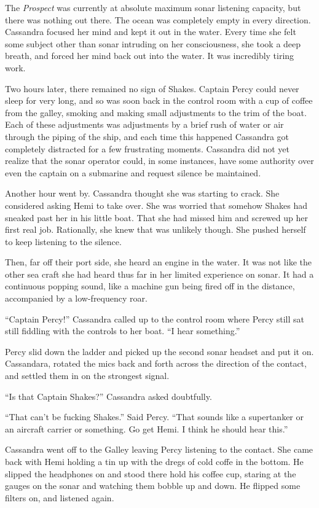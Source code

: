 \documentclass[]{scrbook}
\begin{document}
The \emph{Prospect} was currently at absolute maximum sonar listening
capacity, but there was nothing out there. The ocean was completely
empty in every direction. Cassandra focused her mind and kept it out in
the water. Every time she felt some subject other than sonar intruding
on her consciousness, she took a deep breath, and forced her mind back
out into the water. It was incredibly tiring work.

Two hours later, there remained no sign of Shakes. Captain Percy could
never sleep for very long, and so was soon back in the control room with
a cup of coffee from the galley, smoking and making small adjustments to
the trim of the boat. Each of these adjustments was adjustments by a
brief rush of water or air through the piping of the ship, and each time
this happened Cassandra got completely distracted for a few frustrating
moments. Cassandra did not yet realize that the sonar operator could, in
some instances, have some authority over even the captain on a submarine
and request silence be maintained.

Another hour went by. Cassandra thought she was starting to crack. She
considered asking Hemi to take over. She was worried that somehow Shakes
had sneaked past her in his little boat. That she had missed him and
screwed up her first real job. Rationally, she knew that was unlikely
though. She pushed herself to keep listening to the silence.

Then, far off their port side, she heard an engine in the water. It was
not like the other sea craft she had heard thus far in her limited
experience on sonar. It had a continuous popping sound, like a machine
gun being fired off in the distance, accompanied by a low-frequency
roar.

``Captain Percy!'' Cassandra called up to the control room where Percy
still sat still fiddling with the controls to her boat. ``I hear
something.''

Percy slid down the ladder and picked up the second sonar headset and
put it on. Cassandara, rotated the mics back and forth across the
direction of the contact, and settled them in on the strongest signal.

``Is that Captain Shakes?'' Cassandra asked doubtfully.

``That can't be fucking Shakes.'' Said Percy. ``That sounds like a
supertanker or an aircraft carrier or something. Go get Hemi. I think he
should hear this.''

Cassandra went off to the Galley leaving Percy listening to the contact.
She came back with Hemi holding a tin up with the dregs of cold coffe in
the bottom. He slipped the headphones on and stood there hold his coffee
cup, staring at the gauges on the sonar and watching them bobble up and
down. He flipped some filters on, and listened again.
\end{document}
